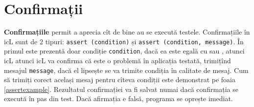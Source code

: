 \section{Confirmații}

{\bf Confirmațiile} permit a aprecia cît de bine au se execută testele. Confirmațiile în icL sunt de 2 tipuri: \texttt{assert (condition)} și \texttt{assert (condition, message)}. În primul este prezentă doar condiție \texttt{condition}, dacă ea este egală cu \false{} sau \void, atunci icL atunci icL va confirma că este o problemă în aplicația testată, trimițînd mesajul \texttt{message}, dacă el lipsește se va trimite condiția în calitate de mesaj. Cum să trimiți corect același mesaj pentru cîteva condiții este demonstrat pe foaia \ref{assertexample}. Rezultatul confirmației va fi salvat numai dacă confirmația se execută în pas din test. Dacă afirmația e falsă, programa se oprește imediat.

\begin{sourcecode}
    \label{assertexample}
    \inputminted[linenos]{icl}{../sources/assertexample.icL}
\end{sourcecode}
